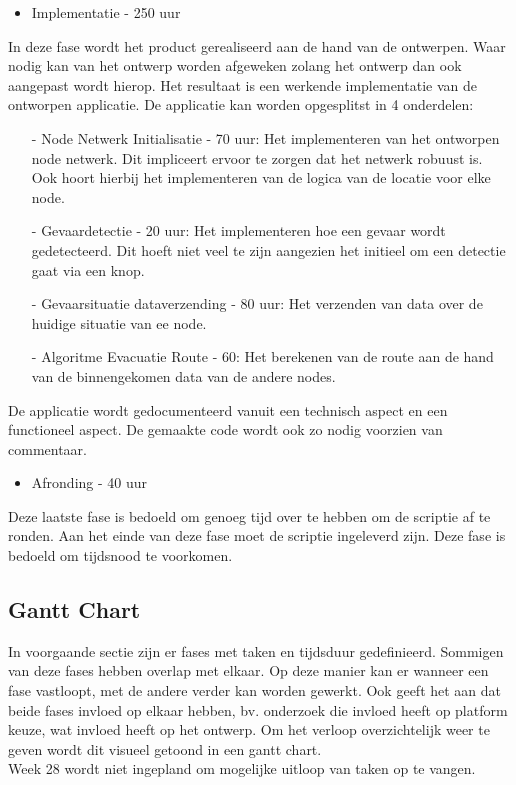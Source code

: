 \documentclass{../local}
\begin{document}
\begin{itemize}
\item Implementatie - 250 uur
\end{itemize}
In deze fase wordt het product gerealiseerd aan de hand van de ontwerpen. Waar nodig kan van het ontwerp worden afgeweken zolang het ontwerp dan ook aangepast wordt hierop. Het resultaat is een werkende implementatie van de ontworpen applicatie. De applicatie kan worden opgesplitst in 4 onderdelen:
\begin{itemize}
\item[-] Node Netwerk Initialisatie - 70 uur: Het implementeren van het ontworpen node netwerk. Dit impliceert ervoor te zorgen dat het netwerk robuust is. Ook hoort hierbij het implementeren van de logica van de locatie voor elke node.
\item[-] Gevaardetectie - 20 uur: Het implementeren hoe een gevaar wordt gedetecteerd. Dit hoeft niet veel te zijn aangezien het initieel om een detectie gaat via een knop.
\item[-] Gevaarsituatie dataverzending - 80 uur: Het verzenden van data over de huidige situatie van ee node. 
\item[-] Algoritme Evacuatie Route - 60: Het berekenen van de route aan de hand van de binnengekomen data van de andere nodes. 
\end{itemize}

\noindent De applicatie wordt gedocumenteerd vanuit een technisch aspect en een functioneel aspect. De gemaakte code wordt ook zo nodig voorzien van commentaar. 

\begin{itemize}
\item Afronding - 40 uur
\end{itemize}
Deze laatste fase is bedoeld om genoeg tijd over te hebben om de scriptie af te ronden. Aan het einde van deze fase moet de scriptie ingeleverd zijn. Deze fase is bedoeld om tijdsnood te voorkomen.

\newpage
\subsection{Gantt Chart}
In voorgaande sectie zijn er fases met taken en tijdsduur gedefinieerd. Sommigen van deze fases hebben overlap met elkaar. Op deze manier kan er wanneer een fase vastloopt, met de andere verder kan worden gewerkt. Ook geeft het aan dat beide fases invloed op elkaar hebben, bv. onderzoek die invloed heeft op platform keuze, wat invloed heeft op het ontwerp. Om het verloop overzichtelijk weer te geven wordt dit visueel getoond in een gantt chart.\\
Week 28 wordt niet ingepland om mogelijke uitloop van taken op te vangen.\\
\end{document}
